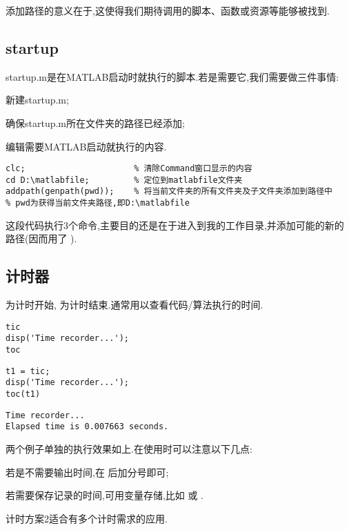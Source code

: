 \myenddot

添加路径的意义在于,这使得我们期待调用的脚本、函数或资源等能够被找到.




\subsection{startup}
startup.m是在MATLAB启动时就执行的脚本.若是需要它,我们需要做三件事情:
\begindot
  \item 新建startup.m;
  \item 确保startup.m所在文件夹的路径已经添加;
  \item 编辑需要MATLAB启动就执行的内容.
\myenddot

\vspace{-0.8cm}
\begin{lstlisting}[caption = 我的startup.m]
clc;                      % 清除Command窗口显示的内容
cd D:\matlabfile;         % 定位到matlabfile文件夹
addpath(genpath(pwd));    % 将当前文件夹的所有文件夹及子文件夹添加到路径中
% pwd为获得当前文件夹路径,即D:\matlabfile
\end{lstlisting}
这段代码执行3个命令,主要目的还是在于进入到我的工作目录,并添加可能的新的路径(因而用了 ).



\subsection{计时器}
 为计时开始,  为计时结束.通常用以查看代码/算法执行的时间.

\vspace{-0.8cm}
\begin{lstlisting}[caption = 计时1]
tic
disp('Time recorder...');
toc
\end{lstlisting}

\vspace{-0.8cm}
\begin{lstlisting}[caption=计时2]
t1 = tic;
disp('Time recorder...');
toc(t1)
\end{lstlisting}

\vspace{-0.8cm}
\begin{lstlisting}
Time recorder...
Elapsed time is 0.007663 seconds.
\end{lstlisting}

两个例子单独的执行效果如上.在使用时可以注意以下几点:
\begindot
  \item 若是不需要输出时间,在  后加分号即可;
  \item 若需要保存记录的时间,可用变量存储,比如  或  .
  \item 计时方案2适合有多个计时需求的应用.
\myenddot

